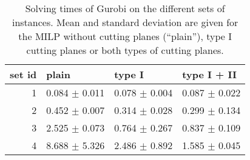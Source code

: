 

\begin{knitrout}
\color{fgcolor}\begin{table}

\caption{\label{tab:unnamed-chunk-2}Solving times of Gurobi on the different sets of instances. Mean and standard deviation are given for the MILP without cutting planes (``plain''), type I cutting planes or both types of cutting planes. \label{tab:running_times}}
\centering
\begin{tabular}[t]{rlll}
\toprule
set id & plain & type I & type I + II\\
\midrule
1 & 0.084 $\pm$ 0.011 & 0.078 $\pm$ 0.004 & 0.087 $\pm$ 0.022\\
2 & 0.452 $\pm$ 0.007 & 0.314 $\pm$ 0.028 & 0.299 $\pm$ 0.134\\
3 & 2.525 $\pm$ 0.073 & 0.764 $\pm$ 0.267 & 0.837 $\pm$ 0.109\\
4 & 8.688 $\pm$ 5.326 & 2.486 $\pm$ 0.892 & 1.585 $\pm$ 0.045\\
\bottomrule
\end{tabular}
\end{table}

\end{knitrout}
